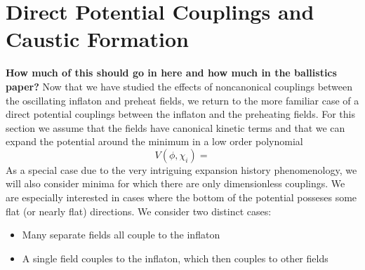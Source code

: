\documentclass[a4paper,11pt]{article}
\begin{document}
\section{Direct Potential Couplings and Caustic Formation}
{\bf How much of this should go in here and how much in the ballistics paper?}
Now that we have studied the effects of noncanonical couplings between the oscillating inflaton and preheat fields, 
we return to the more familiar case of a direct potential couplings between the inflaton and the preheating fields.
For this section we assume that the fields have canonical kinetic terms and that we can expand the potential around the minimum in a low order polynomial
\begin{equation}
  V(\phi,\chi_i) = 
\end{equation}
As a special case due to the very intriguing expansion history phenomenology,
we will also consider minima for which there are only dimensionless couplings.
We are especially interested in cases where the bottom of the potential posseses some flat (or nearly flat) directions.
We consider two distinct cases:
\begin{itemize}
  \item Many separate fields all couple to the inflaton
  \item A single field couples to the inflaton, which then couples to other fields
\end{itemize}
\end{document}
